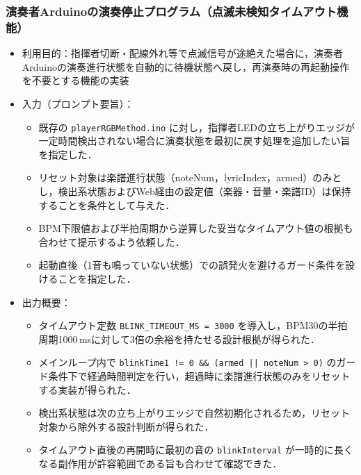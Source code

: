 \documentclass[lualatex,paper=a4paper,jafontsize=11.5pt,jafontscale=1.05]{jlreq}
\begin{document}
\subsubsection{演奏者Arduinoの演奏停止プログラム（点滅未検知タイムアウト機能）}
\begin{itemize}
    \item 利用目的：指揮者切断・配線外れ等で点滅信号が途絶えた場合に，演奏者Arduinoの演奏進行状態を自動的に待機状態へ戻し，再演奏時の再起動操作を不要とする機能の実装
    \item 入力（プロンプト要旨）：
    \begin{itemize}
        \item 既存の \texttt{playerRGBMethod.ino} に対し，指揮者LEDの立ち上がりエッジが一定時間検出されない場合に演奏状態を最初に戻す処理を追加したい旨を指定した．
        \item リセット対象は楽譜進行状態（noteNum，lyricIndex，armed）のみとし，検出系状態およびWeb経由の設定値（楽器・音量・楽譜ID）は保持することを条件として与えた．
        \item BPM下限値および半拍周期から逆算した妥当なタイムアウト値の根拠も合わせて提示するよう依頼した．
        \item 起動直後（1音も鳴っていない状態）での誤発火を避けるガード条件を設けることを指定した．
    \end{itemize}
    \item 出力概要：
    \begin{itemize}
        \item タイムアウト定数 \texttt{BLINK\_TIMEOUT\_MS = 3000} を導入し，BPM30の半拍周期1000\,msに対して3倍の余裕を持たせる設計根拠が得られた．
        \item メインループ内で \texttt{blinkTime1 != 0 \&\& (armed || noteNum > 0)} のガード条件下で経過時間判定を行い，超過時に楽譜進行状態のみをリセットする実装が得られた．
        \item 検出系状態は次の立ち上がりエッジで自然初期化されるため，リセット対象から除外する設計判断が得られた．
        \item タイムアウト直後の再開時に最初の音の \texttt{blinkInterval} が一時的に長くなる副作用が許容範囲である旨も合わせて確認できた．
    \end{itemize}
\end{itemize}
\end{document}
